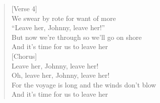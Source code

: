 \documentclass[11pt]{article}
\begin{document}
\begin{verse}
\vspace*{1em}
[Verse 4]\\
We swear by rote for want of more\\
``Leave her, Johnny, leave her!''\\
But now we're through so we'll go on shore\\
And it's time for us to leave her\\
\vspace*{1em}
[Chorus]\\
Leave her, Johnny, leave her!\\
Oh, leave her, Johnny, leave her!\\
For the voyage is long and the winds don't blow\\
And it's time for us to leave her\\
\end{verse}
\clearpage
\end{document}
